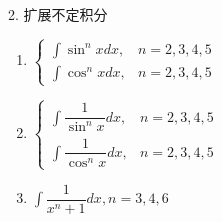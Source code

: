 \begin{theorem}[常用不定积分]
\begin{enumerate}
	\end{enumerate}
	2. 扩展不定积分
	\begin{enumerate}
		\item $\begin{cases} \int \sin^{n} xdx, & n = 2,3,4,5   \\ \int \cos^{n} xdx, & n = 2,3,4,5 \end{cases}$
		\item $\begin{cases} \int \dfrac{1}{\sin^{n} x}dx, & n = 2,3,4,5   \\ \int \dfrac{1}{\cos^{n} x}dx, & n = 2,3,4,5 \end{cases}$
		\item $\int \dfrac{1}{x^{n}+1} dx , n = 3,4,6$
	\end{enumerate}
\end{theorem}

